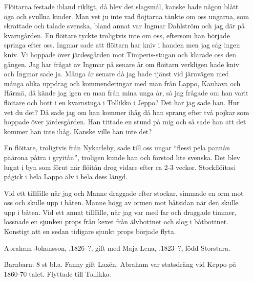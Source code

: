 Flöitarna festade ibland rikligt, då blev det slagsmål, kanske hade någon blått öga och svullna kinder. Man vet ju inte vad flöjtarna tänkte om oss ungarna, som skrattade och talade svenska, bland annat var Ingmar Dahlström och jag där på kvarngården. En flöitare tyckte troligtvis inte om oss, eftersom han började springa efter oss. Ingmar sade att flöitarn har kniv i handen men jag såg ingen kniv. Vi hoppade över järdesgården mot Timperis-stugan och klarade oss den gången. Jag har frågat av Ingmar på senare år om flöitarn verkligen hade kniv och Ingmar sade ja. Många år senare då jag hade tjänst vid järnvägen med många olika uppdrag och kommenderingar med män från Lappo, Kauhava och Härmä, då kände jag igen en man från mina unga år, så jag frågade om han varit flöitare och bott i en kvarnstuga i Tollikko i Jeppo? Det har jag sade han. Hur vet du det? Då sade jag om han kommer ihåg då han sprang efter två pojkar som hoppade över järdesgården. Han tittade en stund på mig och så sade han att det kommer han inte ihåg. Kanske ville han inte det?

En flöitare, troligtvis från Nykarleby, sade till oss ungar ``flessi pela pannån päärona påtra i gryitån'', troligen kunde han och förstod lite svenska. Det blev lugnt i byn som förut när flöitån drog vidare efter ca 2-3 veckor. Stockflöitasi pågick i hela Lappo älv i hela dess längd.

Vid ett tillfälle när jag och Manne draggade efter stockar, simmade en orm mot oss och skulle upp i båten. Manne högg av ormen mot båtsidan när den skulle upp i båten. Vid ett annat tillfälle, när jag var med far och draggade timmer, lossnade en sjunken props från kexet från älvbottnet och slog i båtbottnet. Konstigt att en sedan tidigare sjunkt props började flyta.




Abraham Johansson, .1826--?, gift med Maja-Lena, .1823--?, född Storstara.
\begin{jhchildren}
  \item {}
  \item {}
\end{jhchildren}
Barnbarn: 8 st bl.a. Fanny gift Laxén. Abraham var statsdräng vid Keppo på 1860-70 talet. Flyttade till Tollikko.


